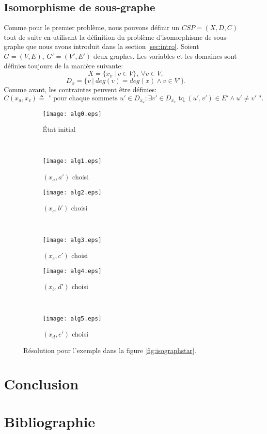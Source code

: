 \documentclass[french]{article}
\theoremstyle{definition}
\theoremstyle{remark}
\begin{document}
\newpage
\subsection{Isomorphisme de sous-graphe}
Comme pour le premier problème, nous pouvons définir un $CSP=(X, D, C)$ tout de suite en utilisant la définition du problème d'isomorphisme de sous-graphe que nous avons introduit dans la section 
\ref{sec:intro}. Soient $G=(V, E),\ G'=(V', E')$ deux graphes. Les variables et les domaines sont définies toujours de la manière suivante:
$$X=\{x_v\ |\ v \in V \},\ \forall v \in V,$$
$$D_{x}=\{v\ |\ deg(v)=deg(x) \land v \in V'\}.$$
Comme avant, les contraintes peuvent être définies:
$$C(x_u, x_v) \triangleq \text{ " pour chaque sommets } u' \in D_{x_u}: \exists v' \in D_{x_v} \text{ tq } (u', v') \in E' \land u' \neq v' \text{ "}.$$

\begin{figure*}[t!]
	
	\centering
	\begin{subfigure}[t]{0.5\textwidth}
		\centering
		\texttt{[image: alg0.eps]}
		\caption{État initial}
	\end{subfigure}%
	~ 
	\begin{subfigure}[t]{0.5\textwidth}
		\centering
		\texttt{[image: alg1.eps]}
		\caption{$(x_a, a')$ choisi}
	\end{subfigure}
		\centering
	\begin{subfigure}[t]{0.5\textwidth}
		\centering
		\texttt{[image: alg2.eps]}
		\caption{$(x_c, b')$ choisi}
	\end{subfigure}%
	~ 
	\begin{subfigure}[t]{0.5\textwidth}
		\centering
		\texttt{[image: alg3.eps]}
		\caption{$(x_e, c')$ choisi}
	\end{subfigure}
\centering
\begin{subfigure}[t]{0.5\textwidth}
\centering
\texttt{[image: alg4.eps]}
\caption{$(x_b, d')$ choisi}
\end{subfigure}%
~ 
\begin{subfigure}[t]{0.5\textwidth}
\centering
\texttt{[image: alg5.eps]}
\caption{$(x_d, e')$ choisi}
\end{subfigure}
\caption{\label{fig:algstar} Résolution pour l'exemple dans la figure \ref{fig:isographstar}.}
\end{figure*}




\newpage
\section{Conclusion}


\newpage
\section{Bibliographie}
\end{document}
